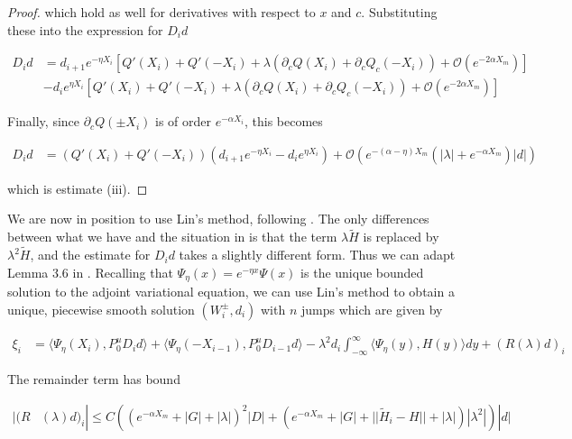 \documentclass[thesis.tex]{subfiles}
\begin{document}
\begin{lemma}
\begin{proof}
which hold as well for derivatives with respect to $x$ and $c$. Substituting these into the expression for $D_i d$

\begin{align*}
D_i d &= d_{i+1} e^{-\eta X_i} \left[ Q'(X_i) + Q'(-X_i) + \lambda( \partial_c Q(X_i) + \partial_c Q_c(-X_i)) + \mathcal{O} \left( e^{-2 \alpha X_m} \right) \right] \\
&- d_i e^{\eta X_i} \left[ Q'(X_i) + Q'(-X_i) + \lambda( \partial_c Q(X_i) + \partial_c Q_c(-X_i)) + \mathcal{O} \left( e^{-2 \alpha X_m} \right) \right]
\end{align*}

Finally, since $\partial_c Q(\pm X_i)$ is of order $e^{-\alpha X_i}$, this becomes

\begin{align*}
D_i d &= ( Q'(X_i) + Q'(-X_i) )(d_{i+1} e^{-\eta X_i} - d_i e^{\eta X_i})
+ \mathcal{O} \left( e^{-(\alpha - \eta) X_m}\left( |\lambda| +  e^{-\alpha X_m} \right) |d| \right)
\end{align*}

which is estimate (iii).

\end{proof}
\end{lemma}

We are now in position to use Lin's method, following \cite{Sandstede1998}. The only differences between what we have and the situation in \cite{Sandstede1998} is that the term $\lambda \tilde{H}$ is replaced by $\lambda^2 \tilde{H}$, and the estimate for $D_i d$ takes a slightly different form. Thus we can adapt Lemma 3.6 in \cite{Sandstede1998}. Recalling that $\Psi_\eta(x) = e^{-\eta x}\Psi(x)$ is the unique bounded solution to the adjoint variational equation, we can use Lin's method to obtain a unique, piecewise smooth solution $(W_i^\pm, d_i)$ with $n$ jumps which are given by

\begin{align*}
\xi_i &= \langle \Psi_\eta(X_i), P_0^u D_i d \rangle
+ \langle \Psi_\eta(-X_{i-1}), P_0^u D_{i-1} d \rangle
- \lambda^2 d_i \int_{-\infty}^\infty \langle \Psi_\eta(y), H(y) \rangle dy
+ (R(\lambda)d)_i
\end{align*}

The remainder term has bound

\begin{align*}
|(R&(\lambda)d)_i| \leq C \left( (e^{-\alpha X_m} + |G| + |\lambda|)^2 |D| + (e^{-\alpha X_m} + |G| + ||\tilde{H}_i - H|| + |\lambda| )|\lambda^2| \right)|d|
\end{align*}
\end{document}
